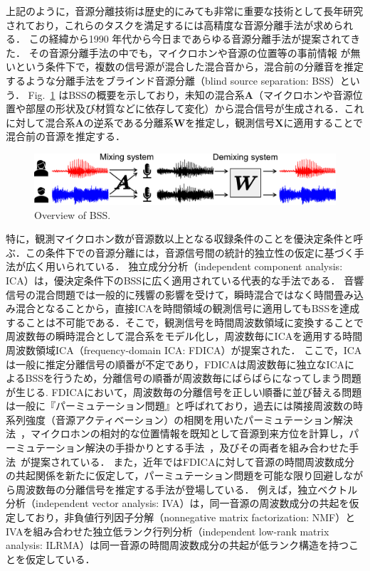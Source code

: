 上記のように，音源分離技術は歴史的にみても非常に重要な技術として長年研究されており，これらのタスクを満足するには高精度な音源分離手法が求められる．
この経緯から1990 年代から今日まであらゆる音源分離手法が提案されてきた．
その音源分離手法の中でも，マイクロホンや音源の位置等の事前情報
が無いという条件下で，複数の信号源が混合した混合音から，混合前の分離音を推定するような分離手法をブラインド音源分離（blind source separation: BSS）\cite{BSS}という．
Fig.~\ref{fig:bss} はBSSの概要を示しており，未知の混合系$\bm{A}$（マイクロホンや音源位置や部屋の形状及び材質などに依存して変化）から混合信号が生成される．これに対して混合系$\bm{A}$の逆系である分離系$\bm{W}$を推定し，観測信号$\bm{X}$に適用することで混合前の音源を推定する．
\begin{figure}[t]
    \vspace{4pt}
    \begin{center}
        \includegraphics[width=0.9\columnwidth]{figures/BSS.pdf}
    \end{center}
    \vspace{-8pt}
	\caption{Overview of BSS.}
	\label{fig:bss}
\end{figure}

特に，観測マイクロホン数が音源数以上となる収録条件のことを優決定条件と呼ぶ．この条件下での音源分離には，音源信号間の統計的独立性の仮定に基づく手法が広く用いられている．
独立成分分析（independent component analysis: ICA）\cite{ICA}は，優決定条件下のBSSに広く適用されている代表的な手法である．
音響信号の混合問題では一般的に残響の影響を受けて，瞬時混合ではなく時間畳み込み混合となることから，直接ICAを時間領域の観測信号に適用してもBSSを達成することは不可能である．そこで，観測信号を時間周波数領域に変換することで周波数毎の瞬時混合として混合系をモデル化し，周波数毎にICAを適用する時間周波数領域ICA（frequency-domain ICA: FDICA）\cite{FDICA}が提案された．
ここで，ICAは一般に推定分離信号の順番が不定であり，FDICAは周波数毎に独立なICAによるBSSを行うため，分離信号の順番が周波数毎にばらばらになってしまう問題が生じる.
FDICAにおいて，周波数毎の分離信号を正しい順番に並び替える問題は一般に『パーミュテーション問題』と呼ばれており，過去には隣接周波数の時系列強度（音源アクティベーション）の相関を用いたパーミュテーション解決法~\cite{COR}，マイクロホンの相対的な位置情報を既知として音源到来方位を計算し，パーミュテーション解決の手掛かりとする手法~\cite{DOA}，及びその両者を組み合わせた手法~\cite{DOACOR}が提案されている．
また，近年ではFDICAに対して音源の時間周波数成分の共起関係を新たに仮定して，パーミュテーション問題を可能な限り回避しながら周波数毎の分離信号を推定する手法が登場している．
例えば，独立ベクトル分析（independent vector analysis: IVA）\cite{IVA1,IVA2}は，同一音源の周波数成分の共起を仮定しており，非負値行列因子分解（nonnegative matrix factorization: NMF）\cite{NMF}とIVAを組み合わせた独立低ランク行列分析（independent low-rank matrix analysis: ILRMA）\cite{ILRMA1,ILRMA2}は同一音源の時間周波数成分の共起が低ランク構造を持つことを仮定している．


